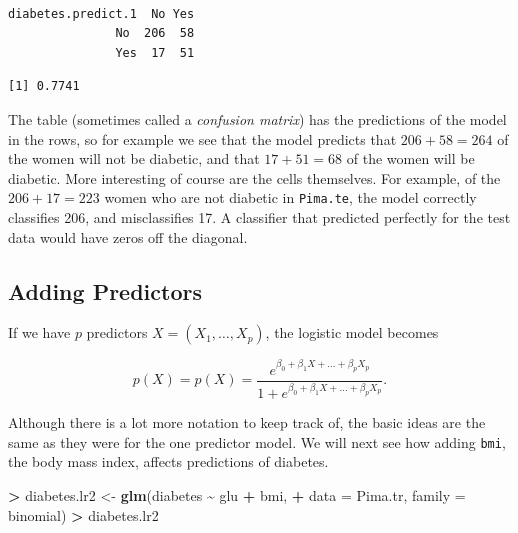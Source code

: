 \documentclass[
]{krantz}
\makeatletter
\newenvironment{Shaded}{\begin{snugshade}}{\end{snugshade}}
\newcommand{\DataTypeTok}[1]{\textcolor[rgb]{0.27,0.27,0.27}{#1}}
\newcommand{\DecValTok}[1]{\textcolor[rgb]{0.06,0.06,0.06}{#1}}
\newcommand{\FloatTok}[1]{\textcolor[rgb]{0.06,0.06,0.06}{#1}}
\newcommand{\KeywordTok}[1]{\textcolor[rgb]{0.27,0.27,0.27}{\textbf{#1}}}
\newcommand{\NormalTok}[1]{#1}
\newcommand{\OperatorTok}[1]{\textcolor[rgb]{0.43,0.43,0.43}{\textbf{#1}}}
\newcommand{\StringTok}[1]{\textcolor[rgb]{0.5,0.5,0.5}{#1}}
\newenvironment{kframe}{%
\medskip{}
\setlength{\fboxsep}{.8em}
 \def\at@end@of@kframe{}%
 \ifinner\ifhmode%
  \def\at@end@of@kframe{\end{minipage}}%
  \begin{minipage}{\columnwidth}%
 \fi\fi%
 \def\FrameCommand##1{\hskip\@totalleftmargin \hskip-\fboxsep
 \colorbox{shadecolor}{##1}\hskip-\fboxsep
     \hskip-\linewidth \hskip-\@totalleftmargin \hskip\columnwidth}%
 \MakeFramed {\advance\hsize-\width
   \@totalleftmargin\z@ \linewidth\hsize
   \@setminipage}}%
 {\par\unskip\endMakeFramed%
 \at@end@of@kframe}
\renewenvironment{Shaded}{\begin{kframe}}{\end{kframe}}
\makeatother
\begin{document}
\begin{verbatim}
                  
diabetes.predict.1  No Yes
               No  206  58
               Yes  17  51
\end{verbatim}

\begin{Shaded}
\end{Shaded}

\begin{verbatim}
[1] 0.7741
\end{verbatim}

The table (sometimes called a \emph{confusion matrix}) has the predictions of the model in the rows, so for example we see that the model predicts that \(206 + 58 = 264\) of the women will not be diabetic, and that \(17+51 = 68\) of the women will be diabetic. More interesting of course are the cells themselves. For example, of the \(206 + 17 = 223\) women who are not diabetic in \texttt{Pima.te}, the model correctly classifies 206, and misclassifies 17. A classifier that predicted perfectly for the test data would have zeros off the diagonal.

\hypertarget{adding-predictors}{%
\subsection{Adding Predictors}\label{adding-predictors}}

If we have \(p\) predictors \(X = (X_1, \dots, X_p)\), the logistic model becomes

\[
p(X) = p(X) = \frac{e^{\beta_0 + \beta_1 X + \dots + \beta_p X_p}}{1 + e^{\beta_0 + \beta_1 X + \dots + \beta_p X_p}}.
\]

Although there is a lot more notation to keep track of, the basic ideas are the same as they were for the one predictor model. We will next see how adding \texttt{bmi}, the body mass index, affects predictions of diabetes.

\begin{Shaded}
\begin{Highlighting}[]
\OperatorTok{\textgreater{}}\StringTok{ }\NormalTok{diabetes.lr2 \textless{}{-}}\StringTok{ }\KeywordTok{glm}\NormalTok{(diabetes }\OperatorTok{\textasciitilde{}}\StringTok{ }\NormalTok{glu }\OperatorTok{+}\StringTok{ }\NormalTok{bmi, }
\OperatorTok{+}\StringTok{                     }\DataTypeTok{data =}\NormalTok{ Pima.tr, }\DataTypeTok{family =}\NormalTok{ binomial)}
\OperatorTok{\textgreater{}}\StringTok{ }\NormalTok{diabetes.lr2}
\end{Highlighting}
\end{Shaded}
\end{document}

